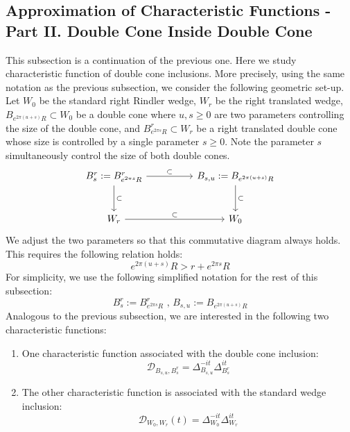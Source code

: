 \documentclass[a4paper,11pt]{article}
\theoremstyle{definition}
\begin{document}
\subsection{Approximation of Characteristic Functions - Part II. Double Cone Inside Double Cone}\label{subsection:coneinsidecone}
This subsection is a continuation of the previous one. Here we study characteristic function of double cone inclusions. More precisely, using the same notation as the previous subsection, we consider the following geometric set-up. Let $W_0$ be the standard right Rindler wedge, $W_r$ be the right translated wedge, $B_{e^{2\pi(u+s)}R}\subset W_0$ be a double cone where $u, s \geq 0$ are two parameters controlling the size of the double cone, and $B^r_{e^{2\pi s}R}\subset W_r$ be a right translated double cone whose size is controlled by a single parameter $s\geq 0$. Note the parameter $s$ simultaneously control the size of both double cones.
\begin{equation}
    \begin{tikzcd}[column sep=huge, row sep=large]
        B^r_s:=B^r_{e^{2\pi s}R} \arrow[r, "\subset"] \arrow[ d, "\subset"] & B_{s,u}:=B_{e^{2\pi(u+s)}R} \arrow[d, "\subset"] 
        \\
        W_r \arrow[r, "\subset"]                 & W_0
    \end{tikzcd}    
\end{equation}
We adjust the two parameters so that this commutative diagram always holds. This requires the following relation holds:
\begin{equation}
    e^{2\pi(u + s)}R > r + e^{2\pi s}R
\end{equation}
For simplicity, we use the following simplified notation for the rest of this subsection:
\begin{equation}
    B^r_s:=B^r_{e^{2\pi s}R}\text{ , }B_{s,u}:=B_{e^{2\pi (u + s)}R}
\end{equation}
Analogous to the previous subsection, we are interested in the following two characteristic functions:
\begin{enumerate}
    \item One characteristic function associated with the double cone inclusion:
    \begin{equation}
        \mathcal{D}_{B_{s,u}, B^r_s} = \Delta_{B_{s,u}}^{-it}\Delta_{B^r_s}^{it}
    \end{equation}
    \item The other characteristic function is associated with the standard wedge inclusion:
    \begin{equation}
        \mathcal{D}_{W_0,W_r}(t) = \Delta_{W_0}^{-it}\Delta_{W_r}^{it}
    \end{equation}
\end{enumerate}
\end{document}
